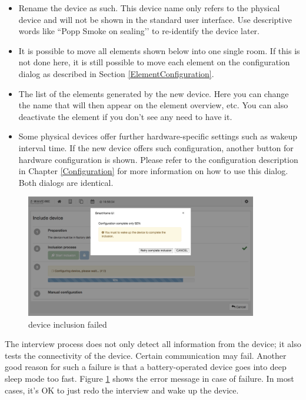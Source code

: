 \begin{itemize}
\item Rename the device as such. This device name only refers to the physical device and 
will not be shown in the standard user interface. Use descriptive words 
like ``Popp Smoke on sealing’’ to re-identify the device later.
\item It is possible to move all elements shown below into one single room. If this is not 
done here, it is still possible to move each element on the configuration dialog as 
described in Section \ref{ElementConfiguration}.
\item The list of the elements generated by the new device. Here you can change the name 
that will then appear on the element overview, etc. You can also deactivate the element 
if you don’t see any need to have it.
\item Some physical devices offer further hardware-specific settings such as wakeup interval 
time. If the new device offers such configuration, another button for hardware 
configuration is shown. Please refer to the \zweui 
configuration description in Chapter \ref{Configuration} for more information on how to 
use this dialog. Both dialogs are identical.
\end{itemize}

\begin{figure}
\begin{center}
\includegraphics[width=0.9\textwidth]{pngs/cap4/incl4.png}
\caption{\zwave device inclusion failed}
\label{incl4}
\end{center}
\end{figure}

The interview process does not only detect all information from the device; it also tests 
the connectivity of the device. Certain communication may fail. Another good reason for 
such a failure is that a battery-operated device goes into deep sleep mode too fast. 
Figure \ref{incl4} shows the error message in case of failure. In most cases, it’s OK to 
just redo the interview and wake up the device.

